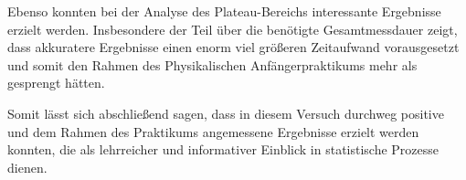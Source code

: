 \documentclass{article}
\newcommand\invisiblesection[1]{%
  \refstepcounter{section}%
  \addcontentsline{toc}{section}{\protect\numberline{\thesection}#1}%
  \sectionmark{#1}\phantom{}}
\begin{document}
Ebenso konnten bei der Analyse des Plateau-Bereichs interessante Ergebnisse erzielt werden. Insbesondere der Teil über die benötigte Gesamtmessdauer zeigt, dass akkuratere Ergebnisse einen enorm viel größeren Zeitaufwand vorausgesetzt und somit den Rahmen des Physikalischen Anfängerpraktikums mehr als gesprengt hätten. 

Somit lässt sich abschließend sagen, dass in diesem Versuch durchweg positive und dem Rahmen des Praktikums angemessene Ergebnisse erzielt werden konnten, die als lehrreicher und informativer Einblick in statistische Prozesse dienen. 


 
\newpage


\end{document}
